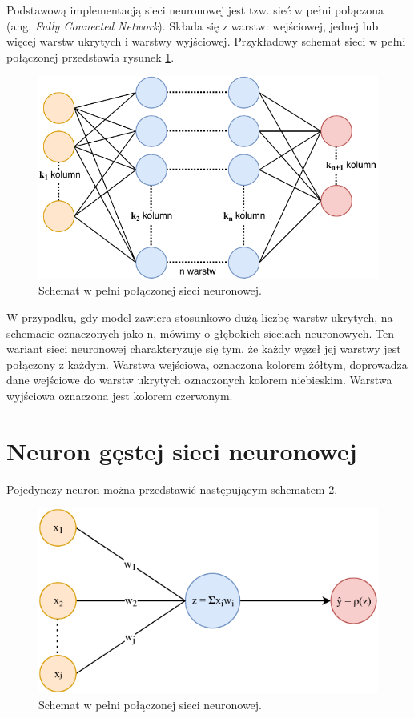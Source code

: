 Podstawową implementacją sieci neuronowej jest tzw. sieć w pełni połączona (ang. \textit{Fully Connected Network}). Składa się z warstw: wejściowej, jednej lub więcej warstw ukrytych i warstwy wyjściowej. Przykładowy schemat sieci w pełni połączonej przedstawia rysunek \ref{fig:schematFc}.

\begin{figure}[ht]
\centerline{\includegraphics[scale=0.9]{resources/fc/fully_connected.pdf}}
\caption{Schemat w pełni połączonej sieci neuronowej.}
\label{fig:schematFc}
\end{figure}

W przypadku, gdy model zawiera stosunkowo dużą liczbę warstw ukrytych, na schemacie oznaczonych jako n, mówimy o głębokich sieciach neuronowych. 
Ten wariant sieci neuronowej charakteryzuje się tym, że każdy węzeł jej warstwy jest połączony z każdym. Warstwa wejściowa, oznaczona kolorem żółtym, doprowadza dane wejściowe do warstw ukrytych oznaczonych kolorem niebieskim. Warstwa wyjściowa oznaczona jest kolorem czerwonym.

\section{Neuron gęstej sieci neuronowej}
Pojedynczy neuron można przedstawić następującym schematem \ref{fig:neuronFc}.

\begin{figure}[ht]
\centerline{\includegraphics[scale=1]{resources/fc/single_neuron_fc.pdf}}
\caption{Schemat w pełni połączonej sieci neuronowej.}
\label{fig:neuronFc}
\end{figure}

